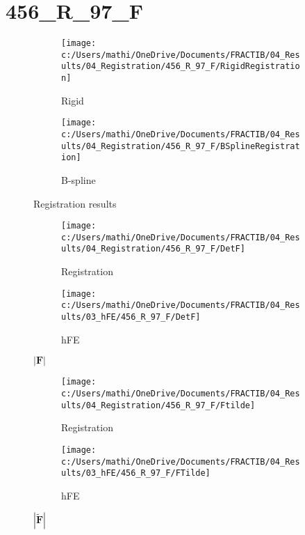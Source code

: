 \documentclass{article}%
\begin{document}
%
\newpage%
\section*{456\_R\_97\_F}%
\label{sec:456R97F}%


\begin{figure}[h!]%
\begin{subfigure}[b]{0.5\linewidth}%
\texttt{[image: c:/Users/mathi/OneDrive/Documents/FRACTIB/04\_Results/04\_Registration/456\_R\_97\_F/RigidRegistration]}%
\caption{Rigid}%
\end{subfigure}%
\begin{subfigure}[b]{0.5\linewidth}%
\texttt{[image: c:/Users/mathi/OneDrive/Documents/FRACTIB/04\_Results/04\_Registration/456\_R\_97\_F/BSplineRegistration]}%
\caption{B{-}spline}%
\end{subfigure}%
\caption{Registration results}%
\end{figure}

%


\begin{figure}[h!]%
\begin{subfigure}[b]{0.5\linewidth}%
\texttt{[image: c:/Users/mathi/OneDrive/Documents/FRACTIB/04\_Results/04\_Registration/456\_R\_97\_F/DetF]}%
\caption{Registration}%
\end{subfigure}%
\begin{subfigure}[b]{0.5\linewidth}%
\texttt{[image: c:/Users/mathi/OneDrive/Documents/FRACTIB/04\_Results/03\_hFE/456\_R\_97\_F/DetF]}%
\caption{hFE}%
\end{subfigure}%
\caption{$|\mathbf{F}|$}%
\end{figure}

%


\begin{figure}[h!]%
\begin{subfigure}[b]{0.5\linewidth}%
\texttt{[image: c:/Users/mathi/OneDrive/Documents/FRACTIB/04\_Results/04\_Registration/456\_R\_97\_F/Ftilde]}%
\caption{Registration}%
\end{subfigure}%
\begin{subfigure}[b]{0.5\linewidth}%
\texttt{[image: c:/Users/mathi/OneDrive/Documents/FRACTIB/04\_Results/03\_hFE/456\_R\_97\_F/FTilde]}%
\caption{hFE}%
\end{subfigure}%
\caption{$|\widetilde{\mathbf{F}}|$}%
\end{figure}

%
\newpage%
\end{document}
